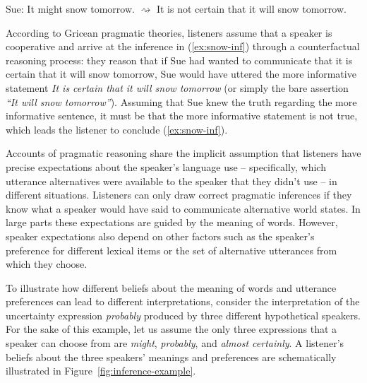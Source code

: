 \begin{exe}
\ex Sue: It might snow tomorrow.
\ex \label{ex:snow-inf} $\rightsquigarrow$  It is not certain that it will snow tomorrow.
\end{exe}

According to Gricean pragmatic theories, listeners assume that a speaker is cooperative and arrive at the inference in (\ref{ex:snow-inf}) through a counterfactual reasoning process: they reason that if Sue had wanted to communicate that it is certain that it will snow tomorrow, Sue would have uttered the more informative statement \textit{It is certain that it will snow tomorrow} (or simply the bare assertion \emph{``It will snow tomorrow''}). Assuming that Sue knew the truth regarding the more informative sentence, it must be that the more informative statement is not true, which leads the listener to conclude (\ref{ex:snow-inf}). 

Accounts of pragmatic reasoning share the implicit assumption that listeners have precise expectations
 about the speaker's language use -- specifically, which utterance alternatives were available to the 
 speaker that they didn't use -- in different situations. Listeners can only draw correct pragmatic 
 inferences if they know what a speaker would have said to communicate alternative world states. 
 In large parts these expectations are guided by the meaning of words.
However, speaker expectations also depend on other factors such as the speaker's preference for
 different lexical items or the set of alternative utterances from which they choose.
 
To illustrate how different beliefs about the meaning of words and utterance preferences can lead to different interpretations, consider the interpretation 
of the uncertainty expression \textit{probably} produced by three different hypothetical speakers. For the sake of this example, 
let us assume the only three expressions that a speaker can choose from are \textit{might}, \textit{probably}, and \textit{almost certainly}.
A listener's beliefs about the three speakers' meanings and preferences are schematically illustrated in Figure~\ref{fig:inference-example}.


